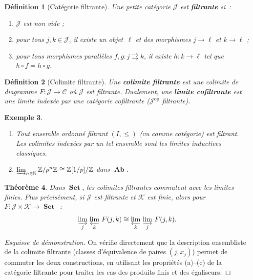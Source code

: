 \documentclass[a4paper,12pt]{book}
\DeclareMathOperator{\Set}{\mathbf{Set}}
\DeclareMathOperator{\Ab}{\mathbf{Ab}}
\newcommand{\op}{\mathrm{op}}
\newcommand{\N}{\mathbb{N}}
\newcommand{\Z}{\mathbb{Z}}
\newtheorem{theoreme}{Théorème}[chapter]
\newtheorem{definition}[theoreme]{Définition}
\newtheorem{exemple}[theoreme]{Exemple}
\begin{document}
\begin{definition}[Catégorie filtrante]\label{def:categorie-filtrante}
Une petite catégorie $\mathcal{J}$ est \textbf{filtrante} si~:
\begin{enumerate}[label=(\alph*)]
\item $\mathcal{J}$ est non vide ;
\item pour tous $j,k\in\mathcal{J}$, il existe un objet~$\ell$ et des
      morphismes $j\to\ell$ et $k\to\ell$ ;
\item pour tous morphismes parallèles $f,g\colon j\rightrightarrows k$,
      il existe $h\colon k\to\ell$ tel que $h\circ f = h\circ g$.
\end{enumerate}
\end{definition}

\begin{definition}[Colimite filtrante]\label{def:colimite-filtrante}
Une \textbf{colimite filtrante} est une colimite de diagramme
$F\colon\mathcal{J}\to\mathcal{C}$ où $\mathcal{J}$ est filtrante.
Dualement, une \textbf{limite cofiltrante}
est une limite indexée par une catégorie cofiltrante
($\mathcal{J}^{\op}$ filtrante).
\end{definition}

\begin{exemple}\label{ex:colimites-filtrantes}
\begin{enumerate}[label=(\roman*)]
\item Tout ensemble ordonné filtrant $(I,\leq)$ (vu comme catégorie)
      est filtrant. Les colimites indexées par un tel ensemble sont
      les \emph{limites inductives} classiques.
\item $\varinjlim_{n\in\N}\Z/p^n\Z \cong \Z[1/p]/\Z$ dans $\Ab$.
\end{enumerate}
\end{exemple}

\begin{theoreme}\label{thm:colimites-filtrantes-set}
\index{colimite!filtrante dans $\Set$}
Dans $\Set$, les colimites filtrantes commutent avec les limites finies.
Plus précisément, si $\mathcal{J}$ est filtrante et $\mathcal{K}$ est finie, alors
pour $F\colon\mathcal{J}\times\mathcal{K}\to\Set$~:
\[
    \varinjlim_j\, \varprojlim_k\, F(j,k)
    \cong \varprojlim_k\, \varinjlim_j\, F(j,k).
\]
\end{theoreme}

\begin{proof}[Esquisse de démonstration]
On vérifie directement que la description ensembliste de la colimite
filtrante (classes d'équivalence de paires $(j,x_j)$) permet de
commuter les deux constructions, en utilisant les propriétés (a)--(c)
de la catégorie filtrante pour traiter les cas des produits finis
et des égaliseurs.
\end{proof}
\end{document}
